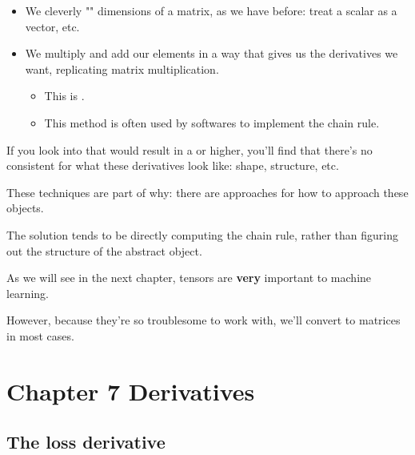 \begin{itemize}
            \item We cleverly "" dimensions of a matrix, as we have before: treat a scalar as a vector, etc.
            
            \item We  multiply and add our elements in a way that gives us the derivatives we want, replicating matrix multiplication.
                \begin{itemize}
                    \item This is .
                    \item This method is often used by softwares to implement the chain rule.\\
                \end{itemize}
        \end{itemize}
        
        \begin{clarification}
            If you look into  that would result in a  or higher, you'll find that there's no consistent  for what these derivatives look like: shape, structure, etc.
            
            These techniques are part of why: there are  approaches for how to approach these objects.

            The solution tends to be directly computing the chain rule, rather than figuring out the structure of the abstract object.
        \end{clarification}
        
        As we will see in the next chapter, tensors are \textbf{very} important to machine learning. 
        
        However, because they're so troublesome to work with, we'll convert to matrices in most cases.
    
    \secdiv

\pagebreak
\section{Chapter 7 Derivatives}
        
    \subsection{The loss derivative}
    
